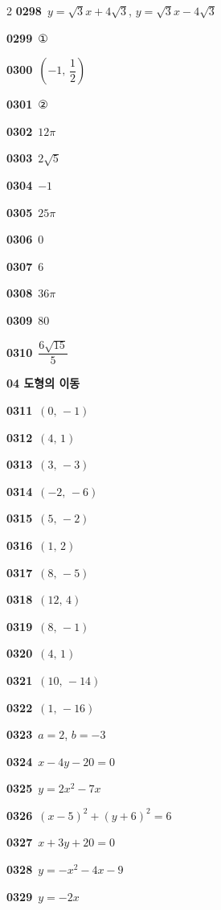 \documentclass[10pt,a4paper]{article}
\begin{document}
\begin{multicols}{2}
\noindent\textbf{0298}\ $y=\sqrt{3}x+4\sqrt{3}$, $y=\sqrt{3}x-4\sqrt{3}$\par
\noindent\textbf{0299}\ ①\par
\noindent\textbf{0300}\ $\left(-1,\,\dfrac{1}{2}\right)$\par
\noindent\textbf{0301}\ ②\par
\noindent\textbf{0302}\ $12\pi$\par
\noindent\textbf{0303}\ $2\sqrt{5}$\par
\noindent\textbf{0304}\ $-1$\par
\noindent\textbf{0305}\ $25\pi$\par
\noindent\textbf{0306}\ $0$\par
\noindent\textbf{0307}\ $6$\par
\noindent\textbf{0308}\ $36\pi$\par
\noindent\textbf{0309}\ $80$\par
\noindent\textbf{0310}\ $\dfrac{6\sqrt{15}}{5}$\par
\noindent\textbf{04 도형의 이동}\par\smallskip
\noindent\textbf{0311}\ $(0,\,-1)$\par
\noindent\textbf{0312}\ $(4,\,1)$\par
\noindent\textbf{0313}\ $(3,\,-3)$\par
\noindent\textbf{0314}\ $(-2,\,-6)$\par
\noindent\textbf{0315}\ $(5,\,-2)$\par
\noindent\textbf{0316}\ $(1,\,2)$\par
\noindent\textbf{0317}\ $(8,\,-5)$\par
\noindent\textbf{0318}\ $(12,\,4)$\par
\noindent\textbf{0319}\ $(8,\,-1)$\par
\noindent\textbf{0320}\ $(4,\,1)$\par
\noindent\textbf{0321}\ $(10,\,-14)$\par
\noindent\textbf{0322}\ $(1,\,-16)$\par
\noindent\textbf{0323}\ $a=2$, $b=-3$\par
\noindent\textbf{0324}\ $x-4y-20=0$\par
\noindent\textbf{0325}\ $y=2x^2-7x$\par
\noindent\textbf{0326}\ $(x-5)^2+(y+6)^2=6$\par
\noindent\textbf{0327}\ $x+3y+20=0$\par
\noindent\textbf{0328}\ $y=-x^2-4x-9$\par
\noindent\textbf{0329}\ $y=-2x$\par

\end{multicols}
\end{document}
